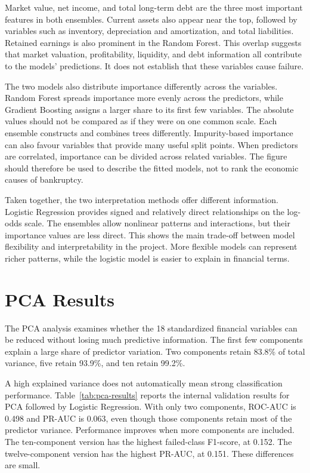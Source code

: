 \documentclass[11pt,a4paper]{article}
\begin{document}
Market value, net income, and total long-term debt are the three most important
features in both ensembles. Current assets also appear near the top, followed
by variables such as inventory, depreciation and amortization, and total
liabilities. Retained earnings is also prominent in the Random Forest. This
overlap suggests that market valuation, profitability, liquidity, and debt
information all contribute to the models' predictions. It does not establish
that these variables cause failure.

The two models also distribute importance differently across the variables. Random Forest spreads
importance more evenly across the predictors, while Gradient Boosting assigns
a larger share to its first few variables. The absolute values should not be
compared as if they were on one common scale. Each ensemble constructs and
combines trees differently. Impurity-based importance can also favour variables
that provide many useful split points. When predictors are correlated, importance
can be divided across related variables. The figure should therefore be used to
describe the fitted models, not to rank the economic causes of bankruptcy.

Taken together, the two interpretation methods offer different information.
Logistic Regression provides signed and relatively direct relationships on the
log-odds scale. The ensembles allow nonlinear patterns and interactions, but
their importance values are less direct. This shows the main trade-off between
model flexibility and interpretability in the project. More flexible models can represent richer patterns,
while the logistic model is easier to explain in financial terms.

\section{PCA Results}
\label{sec:pca-results}

The PCA analysis examines whether the 18 standardized financial variables can
be reduced without losing much predictive information. The first few components
explain a large share of predictor variation. Two components retain 83.8\% of
total variance, five retain 93.9\%, and ten retain 99.2\%.

A high explained variance does not automatically mean strong classification
performance.
Table~\ref{tab:pca-results} reports the internal validation results for PCA
followed by Logistic Regression. With only two components, ROC-AUC is 0.498 and
PR-AUC is 0.063, even though those components retain most of the predictor
variance. Performance improves when more components are included. The
ten-component version has the highest failed-class F1-score, at 0.152. The
twelve-component version has the highest PR-AUC, at 0.151. These differences
are small.
\end{document}

